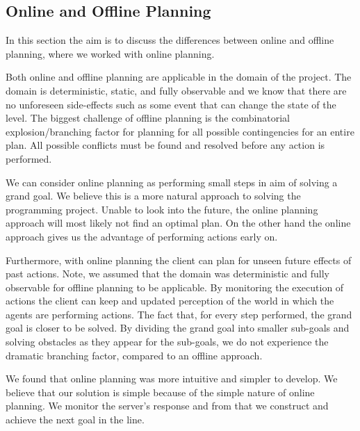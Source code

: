 \subsection{Online and Offline Planning}

In this section the aim is to discuss the differences between online and offline planning, where we worked with online planning.

Both online and offline planning are applicable in the domain of the project.
The domain is deterministic, static, and fully observable and we know that there are no unforeseen side-effects such as some event that can change the state of the level.
The biggest challenge of offline planning is the combinatorial explosion/branching factor for planning for all possible contingencies for an entire plan.
All possible conflicts must be found and resolved before any action is performed.

We can consider online planning as performing small steps in aim of solving a grand goal.
We believe this is a more natural approach to solving the programming project.
Unable to look into the future, the online planning approach will most likely not find an optimal plan.
On the other hand the online approach gives us the advantage of performing actions early on.

Furthermore, with online planning the client can plan for unseen future effects of past actions.
Note, we assumed that the domain was deterministic and fully observable for offline planning to be applicable.
By monitoring the execution of actions the client can keep and updated perception of the world in which the agents are performing actions.
The fact that, for every step performed, the grand goal is closer to be solved.
By dividing the grand goal into smaller sub-goals and solving obstacles as they appear for the sub-goals, we do not experience the dramatic branching factor, compared to an offline approach.

We found that online planning was more intuitive and simpler to develop.
We believe that our solution is simple because of the simple nature of online planning.
We monitor the server's response and from that we construct and achieve the next goal in the line.
